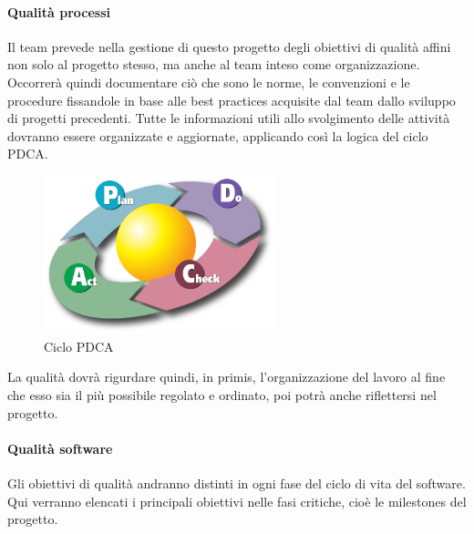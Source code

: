 \paragraph*{Qualit\`{a} processi}

Il team prevede nella gestione di questo progetto degli obiettivi di qualit\`{a} affini non solo al progetto stesso, ma anche al team inteso come organizzazione.\\
Occorrer\`{a} quindi documentare ci\`{o} che sono le norme, le convenzioni e le procedure fissandole in base alle best practices acquisite dal team dallo sviluppo di progetti precedenti. Tutte le informazioni utili allo svolgimento delle attivit\`{a} dovranno essere organizzate e aggiornate, applicando cos\`{i} la logica del ciclo PDCA.

\begin{figure}[H]
\begin{center}
\includegraphics[width=0.60\textwidth]{img/pdca.png}
\caption{Ciclo PDCA}
\label{fig:PDCA}
\end{center}
\end{figure}

La qualit\`{a} dovr\`{a} rigurdare quindi, in primis, l\textquoteright{}organizzazione del lavoro al fine che esso sia il pi\`{u} possibile regolato e ordinato, poi potr\`{a} anche riflettersi nel progetto.

\paragraph*{Qualit\`{a} software}

Gli obiettivi di qualit\`{a} andranno distinti in ogni fase del ciclo di vita del software. Qui verranno elencati i principali obiettivi nelle fasi critiche, cio\`{e} le milestones del progetto.

